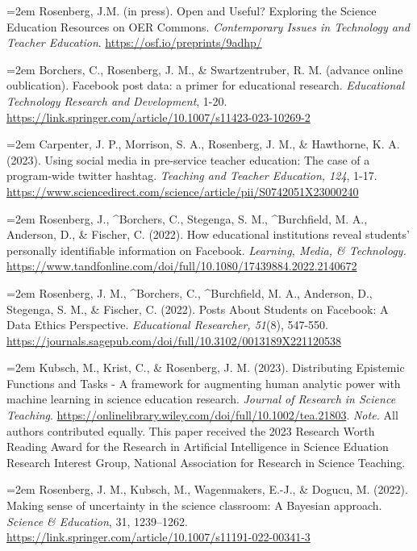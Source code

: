 \documentclass[
  14,
]{article}
\begin{document}
\hangindent=2em Rosenberg, J.M. (in press). Open and Useful? Exploring
the Science Education Resources on OER Commons. \emph{Contemporary
Issues in Technology and Teacher Education}.
\url{https://osf.io/preprints/9adhp/}

\hangindent=2em Borchers, C., Rosenberg, J. M., \& Swartzentruber, R. M.
(advance online oublication). Facebook post data: a primer for
educational research. \emph{Educational Technology Research and
Development}, 1-20.
\url{https://link.springer.com/article/10.1007/s11423-023-10269-2}

\hangindent=2em Carpenter, J. P., Morrison, S. A., Rosenberg, J. M., \&
Hawthorne, K. A. (2023). Using social media in pre-service teacher
education: The case of a program-wide twitter hashtag. \emph{Teaching
and Teacher Education, 124}, 1-17.
\url{https://www.sciencedirect.com/science/article/pii/S0742051X23000240}

\hangindent=2em Rosenberg, J., \^{}Borchers, C., Stegenga, S. M.,
\^{}Burchfield, M. A., Anderson, D., \& Fischer, C. (2022). How
educational institutions reveal students' personally identifiable
information on Facebook. \emph{Learning, Media, \& Technology.}
\url{https://www.tandfonline.com/doi/full/10.1080/17439884.2022.2140672}

\hangindent=2em Rosenberg, J. M., \^{}Borchers, C., \^{}Burchfield, M.
A., Anderson, D., Stegenga, S. M., \& Fischer, C. (2022). Posts About
Students on Facebook: A Data Ethics Perspective. \emph{Educational
Researcher, 51}(8), 547-550.
\url{https://journals.sagepub.com/doi/full/10.3102/0013189X221120538}

\hangindent=2em Kubsch, M., Krist, C., \& Rosenberg, J. M. (2023).
Distributing Epistemic Functions and Tasks - A framework for augmenting
human analytic power with machine learning in science education
research. \emph{Journal of Research in Science Teaching}.
\url{https://onlinelibrary.wiley.com/doi/full/10.1002/tea.21803}.
\emph{Note.} All authors contributed equally. This paper received the
2023 Research Worth Reading Award for the Research in Artificial
Intelligence in Science Eduation Research Interest Group, National
Association for Research in Science Teaching.

\hangindent=2em Rosenberg, J. M., Kubsch, M., Wagenmakers, E.-J., \&
Dogucu, M. (2022). Making sense of uncertainty in the science classroom:
A Bayesian approach. \emph{Science \& Education}, 31, 1239--1262.
\url{https://link.springer.com/article/10.1007/s11191-022-00341-3}
\end{document}
